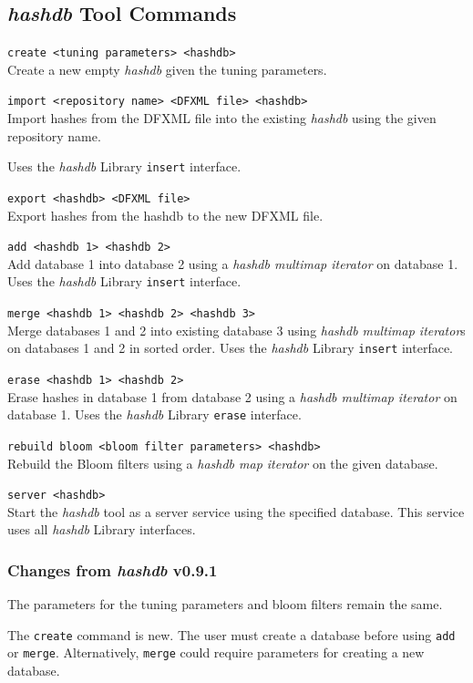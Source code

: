\documentclass[12pt,twoside]{article}
\newcommand{\hdb}{\emph{hashdb}\xspace}
\begin{document}
\subsection{\hdb Tool Commands}
\begin{compactitem}
\item \texttt{create <tuning parameters> <hashdb>} \\
Create a new empty \hdb given the tuning parameters.
\item \texttt{import <repository name> <DFXML file> <hashdb>} \\
Import hashes from the DFXML file into the existing \hdb
using the given repository name.

Uses the \hdb Library \texttt{insert} interface.
\item \texttt{export <hashdb> <DFXML file>} \\
Export hashes from the hashdb to the new DFXML file.
\item \texttt{add <hashdb 1> <hashdb 2>} \\
Add database 1 into database 2
using a \emph{hashdb multimap iterator} on database 1.
Uses the \hdb Library \texttt{insert} interface.
\item \texttt{merge <hashdb 1> <hashdb 2> <hashdb 3>} \\
Merge databases 1 and 2 into existing database 3
using \emph{hashdb multimap iterator}s on databases 1 and 2 in sorted order.
Uses the \hdb Library \texttt{insert} interface.
\item \texttt{erase <hashdb 1> <hashdb 2>} \\
Erase hashes in database 1 from database 2
using a \emph{hashdb multimap iterator} on database 1.
Uses the \hdb Library \texttt{erase} interface.
\item \texttt{rebuild bloom <bloom filter parameters> <hashdb>} \\
Rebuild the Bloom filters
using a \emph{hashdb map iterator} on the given database.
\item \texttt{server <hashdb>} \\
Start the \hdb tool as a server service using the specified database.
This service uses all \hdb Library interfaces.
\end{compactitem}

\subsubsection{Changes from \hdb v0.9.1}
\begin{compactitem}
\item The parameters for the tuning parameters and bloom filters
remain the same.
\item The \texttt{create} command is new.
The user must create a database before using \texttt{add} or \texttt{merge}.
Alternatively, \texttt{merge} could require parameters for creating
a new database.
\end{compactitem}
\end{document}
